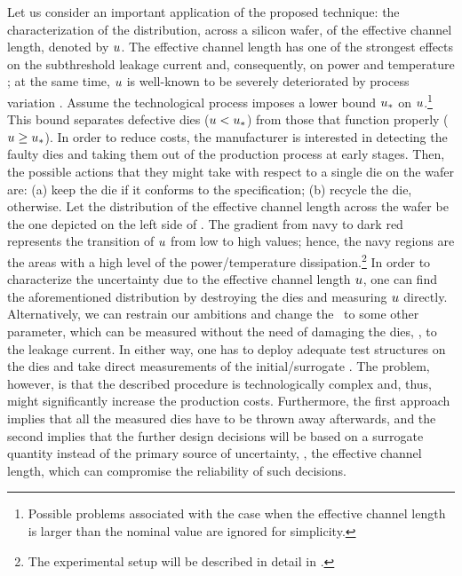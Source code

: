 
Let us consider an important application of the proposed technique: the characterization of the distribution, across a silicon wafer, of the effective channel length, denoted by $u$. The effective channel length has one of the strongest effects on the subthreshold leakage current and, consequently, on power and temperature \cite{juan2011, juan2012}; at the same time, $u$ is well-known to be severely deteriorated by process variation \cite{chandrakasan2001, srivastava2010}.
Assume the technological process imposes a lower bound $u_*$ on $u$.\footnote{Possible problems associated with the case when the effective channel length is larger than the nominal value are ignored for simplicity.} This bound separates defective dies ($u < u_*$) from those that function properly ($u \geq u_*$).
In order to reduce costs, the manufacturer is interested in detecting the faulty dies and taking them out of the production process at early stages. Then, the possible actions that they might take with respect to a single die on the wafer are: (a) keep the die if it conforms to the specification; (b) recycle the die, otherwise.
Let the distribution of the effective channel length across the wafer be the one depicted on the left side of . The gradient from navy to dark red represents the transition of $u$ from low to high values; hence, the navy regions are the areas with a high level of the power/temperature dissipation.\footnote{The experimental setup will be described in detail in .}
In order to characterize the uncertainty due to the effective channel length $u$, one can find the aforementioned distribution by destroying the dies and measuring $u$ directly.
Alternatively, we can restrain our ambitions and change the \qoi\ to some other parameter, which can be measured without the need of damaging the dies, \eg, to the leakage current. In either way, one has to deploy adequate test structures on the dies and take direct measurements of the initial/surrogate \qoi. The problem, however, is that the described procedure is technologically complex and, thus, might significantly increase the production costs.
Furthermore, the first approach implies that all the measured dies have to be thrown away afterwards, and the second implies that the further design decisions will be based on a surrogate quantity instead of the primary source of uncertainty, \ie, the effective channel length, which can compromise the reliability of such decisions.

